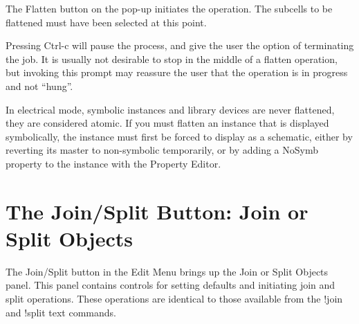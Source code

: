 The {\cb Flatten} button on the pop-up initiates the operation.  The
subcells to be flattened must have been selected at this point.

Pressing {\kb Ctrl-c} will pause the process, and give the user the
option of terminating the job.  It is usually not desirable to stop in
the middle of a flatten operation, but invoking this prompt may
reassure the user that the operation is in progress and not ``hung''.

In electrical mode, symbolic instances and library devices are never
flattened, they are considered atomic.  If you must flatten an
instance that is displayed symbolically, the instance must first be
forced to display as a schematic, either by reverting its master to
non-symbolic temporarily, or by adding a {\et NoSymb} property to the
instance with the {\cb Property Editor}.


\section{The {\cb Join/Split} Button: Join or Split Objects}

The {\cb Join/Split} button in the {\cb Edit Menu} brings up the {\cb
Join or Split Objects} panel.  This panel contains controls for
setting defaults and initiating join and split operations.  These
operations are identical to those available from the {\cb !join} and
{\cb !split} text commands.

